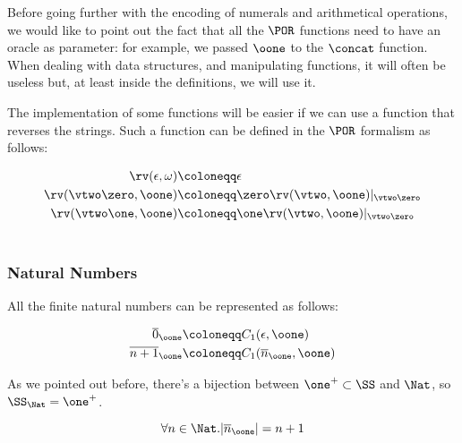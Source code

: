 Before going further with the encoding of numerals and arithmetical operations, we would like to point out the fact that all the $\POR$ functions need to have an oracle as parameter: for example, we passed $\oone$ to the $\concat$ function. When dealing with data structures, and manipulating functions, it will often be useless but, at least inside the definitions, we will use it.

The implementation of some functions will be easier if we can use a function that reverses the strings. Such a function can be defined in the $\POR$ formalism as follows:

\begin{defn}
\label{def:reversingfunction}
\begin{align*}
\rv(\epsilon, \omega) &\coloneqq \epsilon\\
\rv(\vtwo \zero, \oone) &\coloneqq \zero\rv(\vtwo, \oone)|_{\vtwo\zero}\\
\rv(\vtwo \one, \oone) &\coloneqq \one\rv(\vtwo, \oone)|_{\vtwo\zero}\\\\
\end{align*}
\end{defn}


\subsubsection{Natural Numbers}

All the finite natural numbers can be represented as follows:

\begin{defn}
\begin{align*}
\overline 0_\oone &\coloneqq C_1(\epsilon, \oone)\\
\overline {n+1}_\oone &\coloneqq C_1(\overline n_\oone, \oone)
\end{align*}
\end{defn}

\begin{remark}
\label{remark:ssnn}
As we pointed out before, there's a bijection between $\one^+\subset \SS$ and $\Nat$, so $\SS_\Nat= \one^+$.
\end{remark}


\begin{remark}
\label{remark:sizeofnumbers}

\[
\forall n \in \Nat. |\overline n_\oone| = n+1
\]
\end{remark}

